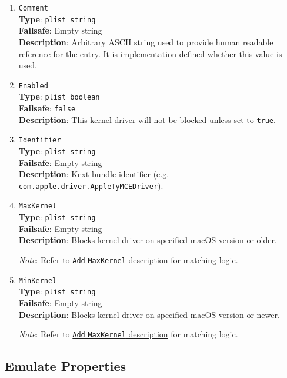 \documentclass[]{article}
\makeatletter
\renewcommand{\label}[1]{%
\zref@wrapper@immediate{\oldlabel{#1}}}  %
\makeatother
\begin{document}
\begin{enumerate}
\item
  \texttt{Comment}\\
  \textbf{Type}: \texttt{plist\ string}\\
  \textbf{Failsafe}: Empty string\\
  \textbf{Description}: Arbitrary ASCII string used to provide human readable
  reference for the entry. It is implementation defined whether this value is
  used.

\item
  \texttt{Enabled}\\
  \textbf{Type}: \texttt{plist\ boolean}\\
  \textbf{Failsafe}: \texttt{false}\\
  \textbf{Description}: This kernel driver will not be blocked unless set to
  \texttt{true}.

\item
  \texttt{Identifier}\\
  \textbf{Type}: \texttt{plist\ string}\\
  \textbf{Failsafe}: Empty string\\
  \textbf{Description}: Kext bundle identifier
    (e.g. \texttt{com.apple.driver.AppleTyMCEDriver}).

\item
  \texttt{MaxKernel}\\
  \textbf{Type}: \texttt{plist\ string}\\
  \textbf{Failsafe}: Empty string\\
  \textbf{Description}: Blocks kernel driver on specified macOS version or older.

  \emph{Note}: Refer to \hyperlink{kernmatch}{\texttt{Add} \texttt{MaxKernel} description} for matching logic.

\item
  \texttt{MinKernel}\\
  \textbf{Type}: \texttt{plist\ string}\\
  \textbf{Failsafe}: Empty string\\
  \textbf{Description}: Blocks kernel driver on specified macOS version or newer.

  \emph{Note}: Refer to \hyperlink{kernmatch}{\texttt{Add} \texttt{MaxKernel} description} for matching logic.

\end{enumerate}

\subsection{Emulate Properties}\label{kernelpropsemu}
\end{document}
